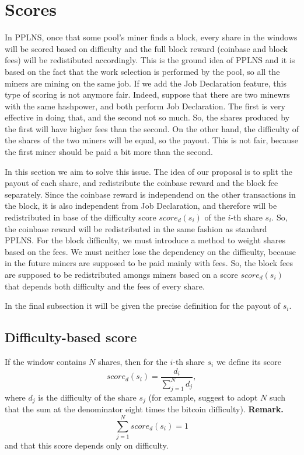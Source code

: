 \documentclass[11pt]{article}
\begin{document}
\section{Scores}
In PPLNS, once that some pool's miner finds a block, every share in the windows will be scored based on difficulty and the full block reward (coinbase and block fees) will be redistibuted accordingly. This is the ground idea of PPLNS and it is based on the fact that the work selection is performed by the pool, so all the miners are mining on the same job. If we add the Job Declaration feature, this type of scoring is not anymore fair. Indeed, suppose that there are two minewrs with the same hashpower, and both perform Job Declaration. The first is very effective in doing that, and the second not so much. So, the shares produced by the first will have higher fees than the second. On the other hand, the difficulty of the shares of the two miners will be equal, so the payout. This is not fair, because the first miner should be paid a bit more than the second.

In this section we aim to solve this issue. The idea of our proposal is to split the payout of each share, and redistribute the coinbase reward and the block fee separately. Since the coinbase reward is independend on the other transactions in the block, it is also independent from Job Declaration, and therefore will be redistributed in base of the difficulty score $score_d(s_i)$ of the $i$-th share $s_i$. So, the coinbase reward will be redistributed in the same fashion as standard PPLNS. \newline
For the block difficulty, we must introduce a method to weight shares based on the fees. We must neither lose the dependency on the difficulty, because in the future miners are supposed to be paid mainly with fees. So, the block fees are supposed to be redistributed amongs miners based on a score $score_d(s_i)$ that depends both difficulty and the fees of every share.

In the final subsection it will be given the precise definition for the payout of $s_i$.

\subsection{Difficulty-based score}
If the window contains $N$ shares, then for the $i$-th share $s_i$ we define its score
\[score_d(s_i) = \frac{d_i}{\sum_{j=1}^Nd_j},\]
where $d_j$ is the difficulty of the share $s_j$ (for example, \cite{ocean} suggest to adopt $N$ such that the sum at the denominator eight times the bitcoin difficulty).\newline
\textbf{Remark.} 
\[\sum_{j=1}^N score_d(s_i) = 1\] and that this score depends only on difficulty.
\end{document}
